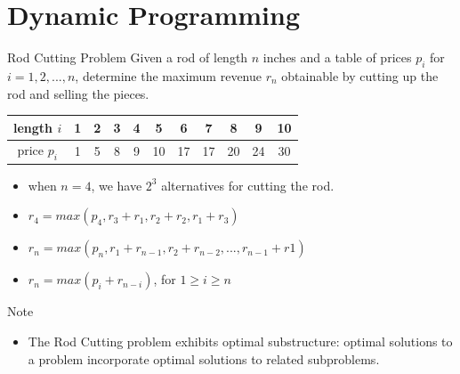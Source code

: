 
\section{Dynamic Programming}
\begin{frame}{Rod Cutting Problem}
  Given a rod of length $n$ inches and a table of prices $p_i$
  for $i = 1, 2, ..., n$, determine the maximum revenue $r_n$ obtainable
  by cutting up the rod and selling the pieces.

\end{frame}

\begin{frame}
  \begin{tabular}{|c|cccc|cccccc|}\hline
    length $i$  & 1 & 2 & 3 & 4 & 5  & 6  & 7  & 8  & 9  & 10 \\ \hline
    price $p_i$ & 1 & 5 & 8 & 9 & 10 & 17 & 17 & 20 & 24 & 30 \\ \hline
  \end{tabular} \pause

  

  \pause

  \begin{itemize}
   \item when $n = 4$, we have $2^{3}$ alternatives for cutting the rod. \pause
   \item $r_4  = max(p_4, r_3 + r_1, r_2 + r_2, r_1 + r_3)$ \pause
   \item $r_n  = max(p_n, r_1 + r_{n-1}, r_2 + r_{n-2}, ..., r_{n-1} + r1)$ \pause
   \item $r_n = max(p_i + r_{n-i})$, for $1 \geq i \geq n$       
  \end{itemize}
\end{frame}

\begin{frame}{Note}

  \begin{itemize}
  \item The {\color{blue}Rod Cutting} problem exhibits
    optimal substructure\pause: optimal solutions
    to a problem incorporate optimal solutions to related subproblems. 
  \end{itemize}
\end{frame}

